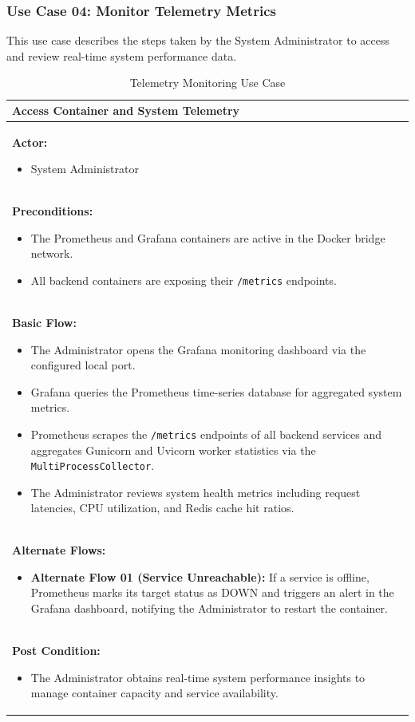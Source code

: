 \subsubsection{Use Case 04: Monitor Telemetry Metrics}
This use case describes the steps taken by the System Administrator to access and review real-time system performance data.
\begin{table}[H]
    \renewcommand{\arraystretch}{1.3}
    \begin{tabularx}{\textwidth}{| X |}
        \hline
        \textbf{Access Container and System Telemetry} \\
        \hline
        \textbf{Actor:}
        \begin{itemize}
            \item System Administrator
        \end{itemize} \\
        \hline
        \textbf{Preconditions:}
        \begin{itemize}
            \item The Prometheus and Grafana containers are active in the Docker bridge network.
            \item All backend containers are exposing their \texttt{/metrics} endpoints.
        \end{itemize} \\
        \hline
        \textbf{Basic Flow:}
        \begin{itemize}
            \item The Administrator opens the Grafana monitoring dashboard via the configured local port.
            \item Grafana queries the Prometheus time-series database for aggregated system metrics.
            \item Prometheus scrapes the \texttt{/metrics} endpoints of all backend services and aggregates Gunicorn and Uvicorn worker statistics via the \texttt{MultiProcessCollector}.
            \item The Administrator reviews system health metrics including request latencies, CPU utilization, and Redis cache hit ratios.
        \end{itemize} \\
        \hline
        \textbf{Alternate Flows:}
        \begin{itemize}
            \item \textbf{Alternate Flow 01 (Service Unreachable):} If a service is offline, Prometheus marks its target status as DOWN and triggers an alert in the Grafana dashboard, notifying the Administrator to restart the container.
        \end{itemize} \\
        \hline
        \textbf{Post Condition:}
        \begin{itemize}
            \item The Administrator obtains real-time system performance insights to manage container capacity and service availability.
        \end{itemize} \\
        \hline
    \end{tabularx}
    \caption{Telemetry Monitoring Use Case}
    \label{tab:telemetry_use_case}
\end{table}
